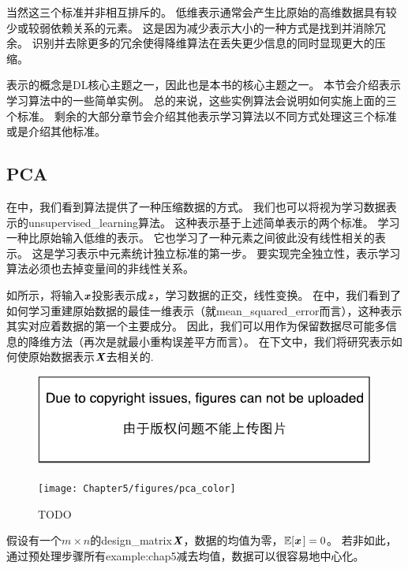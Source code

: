 当然这三个标准并非相互排斥的。
低维表示通常会产生比原始的高维数据具有较少或较弱依赖关系的元素。
这是因为减少表示大小的一种方式是找到并消除冗余。
识别并去除更多的冗余使得降维算法在丢失更少信息的同时显现更大的压缩。

表示的概念是\gls{DL}核心主题之一，因此也是本书的核心主题之一。
本节会介绍表示学习算法中的一些简单实例。
总的来说，这些实例算法会说明如何实施上面的三个标准。
剩余的大部分章节会介绍其他表示学习算法以不同方式处理这三个标准或是介绍其他标准。

\subsection{\gls{PCA}}
\label{sec:principal_components_analysis_chap5}
在中，我们看到算法提供了一种压缩数据的方式。
我们也可以将视为学习数据表示的\gls{unsupervised_learning}算法。
这种表示基于上述简单表示的两个标准。
学习一种比原始输入低维的表示。
它也学习了一种元素之间彼此没有线性相关的表示。
这是学习表示中元素统计独立标准的第一步。
要实现完全独立性，表示学习算法必须也去掉变量间的非线性关系。


如所示，将输入$\boldsymbol{\mathit{x}}$投影表示成$\boldsymbol{\mathit{z}}$，学习数据的正交，线性变换。
在中，我们看到了如何学习重建原始数据的最佳一维表示（就\gls{mean_squared_error}而言），这种表示其实对应着数据的第一个主要成分。
因此，我们可以用作为保留数据尽可能多信息的降维方法（再次是就最小重构误差平方而言）。
在下文中，我们将研究表示如何使原始数据表示$\boldsymbol{\mathit{X}}$去相关的.

\begin{figure}[!htb]
\ifOpenSource
\centerline{\includegraphics{figure.pdf}}
\else
\centerline{\texttt{[image: Chapter5/figures/pca\_color]}}
\fi
\caption{TODO}
\label{fig:chap5_pca}
\end{figure}

假设有一个$m\times n$的\gls{design_matrix}$\boldsymbol{\mathit{X}}$，数据的均值为零，$\mathbb{E}[\boldsymbol{\mathit{x}}\,] = 0$。
若非如此，通过预处理步骤所有\gls{example:chap5}减去均值，数据可以很容易地中心化。

